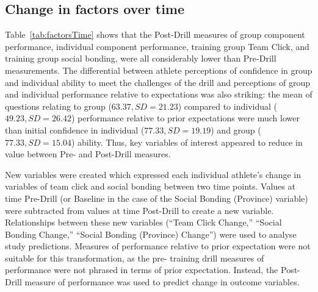 \begin{CJK}{UTF8}{gbsn}



\subsection{Change in factors over time}
Table~\ref{tab:factorsTime} shows that the Post-Drill measures of group component performance, individual component performance, training group Team Click, and training group social bonding, were all considerably lower than Pre-Drill measurements. The differential between athlete perceptions of confidence in group and individual ability to meet the challenges of the drill and perceptions of group and individual performance relative to expectations was also striking: the mean of questions relating to group ($63.37, SD = 21.23$) compared to individual ($49.23, SD = 26.42$) performance relative to prior expectations were much lower than initial confidence in individual ($77.33, SD = 19.19$) and group ($77.33, SD = 15.04$) ability.  Thus, key variables of interest appeared to reduce in value between Pre- and Post-Drill measures.



New variables were created which expressed each individual athlete's change in variables of team click and social bonding between two time points.  Values at time Pre-Drill (or Baseline in the case of the Social Bonding (Province) variable) were subtracted from values at time Post-Drill to create a new variable.  Relationships between these new variables (``Team Click Change,'' ``Social Bonding Change,'' ``Social Bonding (Province) Change'') were used to analyse study predictions. Measures of performance relative to prior expectation were not suitable for this transformation, as the pre- training drill measures of performance were not phrased in terms of prior expectation.  Instead, the Post-Drill measure of performance was used to predict change in outcome variables.


\end{CJK}
